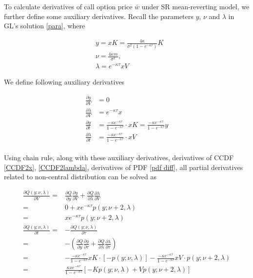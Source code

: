 To calculate derivatives of call option price $\bar{w}$ under SR mean-reverting model, we further define some auxiliary derivatives. Recall the parameters $y$, $\nu$ and $\lambda$ in GL's solution \eqref{para}, where

\begin{equation}
    \begin{aligned}
        &y = xK=\frac{4 \kappa}{\sigma^{2}(1-e^{-\kappa \tau})}K \\
        &\nu=\frac{4 \kappa m}{\sigma^{2}}, \\
        &\lambda= e^{-\kappa \tau}x V
    \end{aligned}
\end{equation}

\noindent We define following auxiliary derivatives

\begin{equation}\label{aux diff}
    \begin{aligned}
        \frac{\partial y}{\partial V} &= 0\\
        \frac{\partial \lambda}{\partial V}&= e^{-\kappa \tau}x \\
        \frac{\partial y}{\partial t} &= \frac{-\kappa e^{-\kappa \tau}}{1 - e^{-\kappa \tau}} \cdot xK=\frac{-\kappa e^{-\kappa \tau}}{1 - e^{-\kappa \tau}} y\\
        \frac{\partial \lambda}{\partial t}&= \frac{-\kappa e^{-\kappa \tau}}{1 - e^{-\kappa \tau}} \cdot  xV \\
    \end{aligned}
\end{equation}

Using chain rule, along with these auxiliary derivatives, derivatives of CCDF \eqref{CCDF2x}, \eqref{CCDF2lambda}, derivatives of PDF \eqref{pdf diff}, all partial derivatives related to non-central distribution can be solved as

\begin{equation}\label{ccdf diff2}
    \begin{aligned}
        \frac{\partial Q(y; \nu, \lambda)}{\partial V}=& \frac{\partial Q}{\partial y}\frac{\partial y}{\partial V} + \frac{\partial Q}{\partial \lambda} \frac{\partial \lambda}{\partial V} \\
        =&0 + x e^{-\kappa \tau} p(y ; \nu+2, \lambda)\\
        =& x e^{-\kappa \tau} p(y ; \nu+2, \lambda) \\
        \frac{\partial Q(y; \nu, \lambda)}{\partial t}=& -\frac{\partial Q(y; \nu, \lambda)}{\partial \tau}\\
        =&-\left(\frac{\partial Q}{\partial y}\frac{\partial y}{\partial \tau} + \frac{\partial Q}{\partial \lambda} \frac{\partial \lambda}{\partial \tau}\right) \\
        =& -\frac{-\kappa e^{-\kappa \tau}}{1 - e^{-\kappa \tau}}xK \cdot  [-p(y;\nu,\lambda)]-\frac{-\kappa e^{-\kappa \tau}}{1 - e^{-\kappa \tau}}xV \cdot p(y;\nu+2,\lambda)\\
        =& \frac{\kappa x e^{-\kappa  \tau}}{1 - e^{-\kappa \tau}} \left[-Kp(y;\nu,\lambda) + Vp(y;\nu+2,\lambda)\right]
    \end{aligned}
\end{equation}

